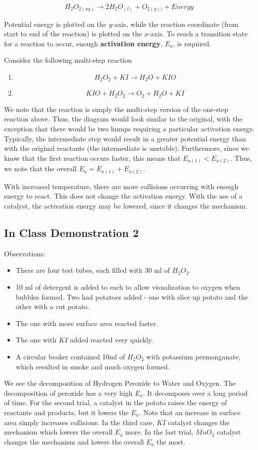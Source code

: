 \documentclass[11pt]{article}
\theoremstyle{plain} %
\theoremstyle{definition}
\theoremstyle{example}
\theoremstyle{remark}
\begin{document}
$$H_2O_{2 (aq)}\rightarrow 2H_2O_{(l)}+ O_{2(g))}+Energy$$

Potential energy is plotted on the $y$-axis, while the reaction coordinate (from start to end of the reaction) is plotted on the $x$-axis. To reach a transition state for a reaction to occur, enough \textbf{activation energy}, $E_a$, is required.

Consider the following multi-step reaction

\begin{enumerate}\item $$H_2O_2 + KI \rightarrow H_2O + KIO$$
\item $$KIO + H_2O_2 \rightarrow O_2 + H_2O + KI$$
\end{enumerate}


We note that the reaction is simply the multi-step version of the one-step reaction above. Thus, the diagram would look similar to the original, with the exception that there would be two humps requiring a particular activation energy. Typically, the intermediate step would result in a greater potential energy than with the original reactants (the intermediate is unstable). Furthermore, since we know that the first reaction occurs faster, this means that $E_{a(1)} < E_{a(2)}$. Thus, we note that the overall $E_a = E_{a(1)} + E_{a(2)}$. 


With increased temperature, there are more collisions occurring with enough energy to react. This does not change the activation energy. With the use of a catalyst, the activation energy may be lowered, since it changes the mechanism. 

\subsection{In Class Demonstration 2}

Observations:

\begin{itemize}
\item There are four test tubes, each filled with 30 ml of $H_2O_2$. 
\item 10 ml of detergent is added to each to allow visualization to oxygen when bubbles formed. Two had potatoes added - one with slice up potato and the other with a cut potato. \item The one with more surface area reacted faster. 
\item The one with $KI$ added reacted very quickly. 
\item A circular beaker contained 10ml of $H_2O_2$ with potassium permanganate, which resulted in smoke and much oxygen formed. 
\end{itemize}
We see the decomposition of Hydrogen Peroxide to Water and Oxygen. The decomposition of peroxide has a very high $E_a$. It decomposes over a long period of time. For the second trial, a catalyst in the potato raises the energy of reactants and products, but it lowers the $E_a$. Note that an increase in surface area simply increases collisions. In the third case, $KI$ catalyst changes the mechanism which lowers the overall $E_a$ more. In the last trial, $MnO_2$ catalyst changes the mechanism and lowers the overall $E_a$ the most. 
\end{document}
